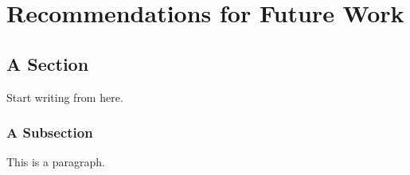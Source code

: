 \chapter{Recommendations for Future Work}
\section{A Section}
Start writing from here.
\subsection{A Subsection}
This is a paragraph.
